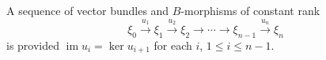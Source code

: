 A sequence of vector bundles and $B$-morphisms of constant rank
$$\xi_0 \xrightarrow{u_1} \xi_1 \xrightarrow{u_2} \xi_2 \rightarrow \cdots \rightarrow \xi_{n-1} \xrightarrow{u_n} \xi_n$$
is  provided $\operatorname{im} u_i = \ker u_{i+1}$ for each $i$, $1 \leq i \leq n-1$.
